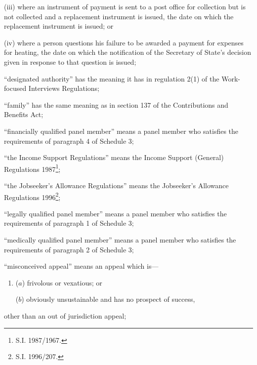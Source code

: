 \documentclass[12pt,a4paper]{article}
\begin{document}
\begin{enumerate}
\begin{enumerate}
\begin{enumerate}
(iii) where an instrument of payment is sent to a post office for collection but is not collected and a replacement instrument is issued, the date on which the replacement instrument is issued; or

(iv) where a person questions his failure to be awarded a payment for expenses for heating, the date on which the notification of the Secretary of State’s decision given in response to that question is issued;
\end{enumerate}
\end{enumerate}

“designated authority” has the meaning it has in regulation 2(1) of the Work-focused Interviews Regulations;

“family” has the same meaning as in section 137 of the Contributions and Benefits Act;

“financially qualified panel member” means a panel member who satisfies the requirements of paragraph 4 of Schedule 3;

“the Income Support Regulations” means the Income Support (General) Regulations 1987\footnote{\frenchspacing S.I. 1987/1967.};

“the Jobseeker’s Allowance Regulations” means the Jobseeker’s Allowance Regulations 1996\footnote{\frenchspacing S.I. 1996/207.};

“legally qualified panel member” means a panel member who satisfies the requirements of paragraph 1 of Schedule 3;

“medically qualified panel member” means a panel member who satisfies the requirements of paragraph 2 of Schedule 3;

“misconceived appeal” means an appeal which is—
\begin{enumerate}\item[]
($a$) frivolous or vexatious; or

($b$) obviously unsustainable and has no prospect of success,
\end{enumerate}
other than an out of jurisdiction appeal;



\end{enumerate}
\end{document}
